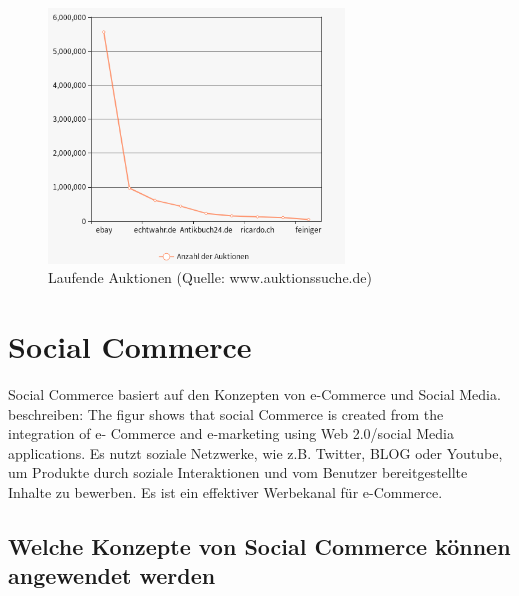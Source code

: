 \begin{figure}
	\centering
	\includegraphics[width=0.7\textwidth]{bilder/laufende-auktionen.png}
	\caption[Laufende Auktionen]{Laufende Auktionen (Quelle: www.auktionssuche.de)}
	\label{fig:laufende-auktionen}
\end{figure}


\section{Social Commerce}

Social Commerce basiert auf den Konzepten von e-Commerce und Social Media. \textcite[S. 8]{turban:sc} beschreiben: \glqq{}The figur shows that social Commerce is created from the integration of e- Commerce and e-marketing using  Web 2.0/social Media applications.\grqq{} Es nutzt soziale Netzwerke, wie z.B. Twitter, BLOG oder Youtube, um Produkte durch soziale Interaktionen und vom Benutzer bereitgestellte Inhalte zu bewerben. Es ist ein effektiver Werbekanal für e-Commerce.


\subsection{Welche Konzepte von Social Commerce können angewendet werden}

